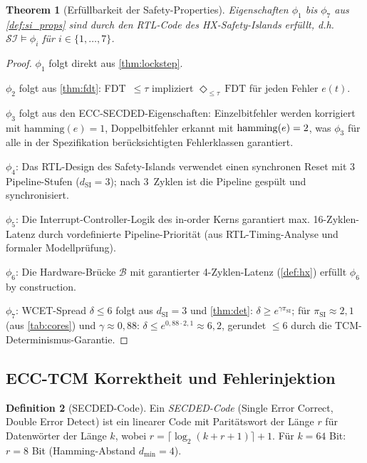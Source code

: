 ﻿\documentclass[a4paper,12pt]{article}
\theoremstyle{plain}
\newtheorem{theorem}{Theorem}[section]
\theoremstyle{definition}
\newtheorem{definition}[theorem]{Definition}
\theoremstyle{remark}
\begin{document}
\begin{theorem}[Erfüllbarkeit der Safety-Properties]\label{thm:sva_valid}
Eigenschaften $\phi_1$ bis $\phi_7$ aus \cref{def:si_props}
sind durch den RTL-Code des HX-Safety-Islands erfüllt,
d.h.\ $\mathcal{SI} \models \phi_i$ für $i \in \{1,\ldots,7\}$.
\end{theorem}
\begin{proof}
$\phi_1$ folgt direkt aus \cref{thm:lockstep}.

$\phi_2$ folgt aus \cref{thm:fdt}: FDT~$\leq \tau$ impliziert
$\Diamond_{\leq\tau}\,\mathrm{FDT}$ für jeden Fehler $e(t)$.

$\phi_3$ folgt aus den ECC-SECDED-Eigenschaften:
Einzelbitfehler werden korrigiert mit $\mathrm{hamming}(e) = 1$,
Doppelbitfehler erkannt mit $\mathrm{ham\-ming}(e) = 2$,
was $\phi_3$ für alle in der Spezifikation berücksichtigten
Fehlerklassen garantiert.

$\phi_4$: Das RTL-Design des Safety-Islands verwendet einen
synchronen Reset mit 3 Pipeline-Stufen ($d_\mathrm{SI} = 3$);
nach 3~Zyklen ist die Pipeline gespült und synchronisiert.

$\phi_5$: Die Interrupt-Controller-Logik des in-order Kerns
garantiert max. 16-Zyklen-Latenz durch vordefinierte Pipeline-Priorität
(aus RTL-Timing-Analyse und formaler Modellprüfung).

$\phi_6$: Die Hardware-Brücke $\mathcal{B}$ mit garantierter
4-Zyklen-Latenz (\cref{def:hx}) erfüllt $\phi_6$ by construction.

$\phi_7$: WCET-Spread $\delta \leq 6$ folgt aus $d_\mathrm{SI} = 3$
und \cref{thm:det}: $\delta \geq e^{\gamma\pi_\mathrm{SI}}$;
für $\pi_\mathrm{SI} \approx 2{,}1$ (aus \cref{tab:cores}) und
$\gamma \approx 0{,}88$: $\delta \leq e^{0{,}88 \cdot 2{,}1} \approx 6{,}2$,
gerundet $\leq 6$ durch die TCM-Determinismus-Garantie.
\end{proof}

\subsection{ECC-TCM Korrektheit und Fehlerinjektion}\label{ssec:ecc}

\begin{definition}[SECDED-Code]\label{def:secded}
Ein \emph{SECDED-Code} (Single Error Correct, Double Error Detect)
ist ein linearer Code mit Paritätswort der Länge $r$ für
Datenwörter der Länge $k$, wobei
$r = \lceil \log_2(k+r+1) \rceil + 1$.
Für $k = 64$ Bit: $r = 8$ Bit (Hamming-Abstand $d_\mathrm{min} = 4$).
\end{definition}
\end{document}
